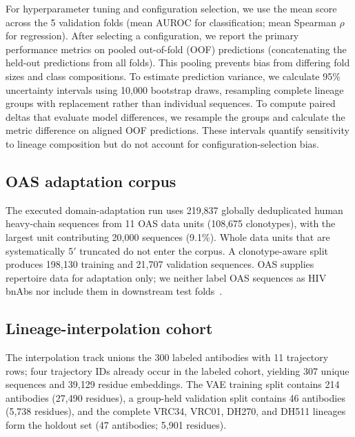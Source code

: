 For hyperparameter tuning and configuration selection, we use the mean
score
across the 5 validation folds (mean AUROC for classification; mean Spearman
$\rho$ for regression). After selecting a configuration, we report the primary
performance metrics on pooled out-of-fold (OOF) predictions
(concatenating the held-out predictions from all folds). This pooling prevents
bias from differing fold sizes and class compositions. To estimate prediction
variance, we calculate 95\% uncertainty intervals using 10,000 bootstrap draws,
resampling complete lineage groups with replacement rather than individual
sequences. To compute paired deltas that evaluate model differences, we
resample the groups and calculate the metric difference on aligned OOF
predictions. These intervals quantify sensitivity to lineage composition but do
not account for configuration-selection bias.

\subsection{OAS adaptation corpus}

The executed domain-adaptation run uses 219,837 globally deduplicated human
heavy-chain sequences from 11 OAS data units (108,675 clonotypes), with the
largest unit contributing 20,000 sequences (9.1\%). Whole data units that are
systematically 5$'$ truncated do not enter the corpus. A clonotype-aware split produces
198,130 training and 21,707 validation sequences. OAS supplies repertoire data
for adaptation only; we neither label OAS sequences as HIV bnAbs nor include them
in downstream test folds~\cite{olsen2022oas}.

\subsection{Lineage-interpolation cohort}

The interpolation track unions the 300 labeled antibodies with 11 trajectory
rows; four trajectory IDs already occur in the labeled cohort, yielding 307
unique sequences and 39,129 residue embeddings. The VAE training split contains
214 antibodies (27,490 residues), a group-held validation split contains 46
antibodies (5,738 residues), and the complete VRC34, VRC01, DH270, and DH511
lineages form the holdout set (47 antibodies; 5,901 residues).
